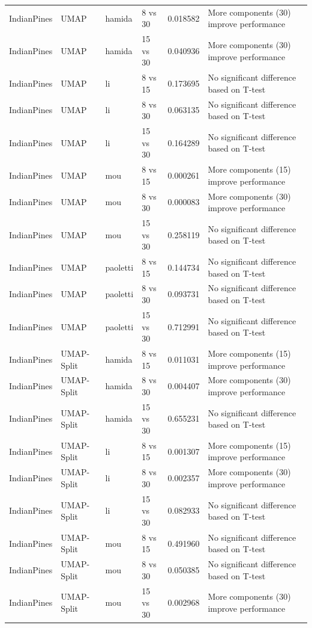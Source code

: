 \begin{longtable}{llllrl}
IndianPines & UMAP & hamida & 8 vs 30 & 0.018582 & More components (30) improve performance \\
IndianPines & UMAP & hamida & 15 vs 30 & 0.040936 & More components (30) improve performance \\
IndianPines & UMAP & li & 8 vs 15 & 0.173695 & No significant difference based on T-test \\
IndianPines & UMAP & li & 8 vs 30 & 0.063135 & No significant difference based on T-test \\
IndianPines & UMAP & li & 15 vs 30 & 0.164289 & No significant difference based on T-test \\
IndianPines & UMAP & mou & 8 vs 15 & 0.000261 & More components (15) improve performance \\
IndianPines & UMAP & mou & 8 vs 30 & 0.000083 & More components (30) improve performance \\
IndianPines & UMAP & mou & 15 vs 30 & 0.258119 & No significant difference based on T-test \\
IndianPines & UMAP & paoletti & 8 vs 15 & 0.144734 & No significant difference based on T-test \\
IndianPines & UMAP & paoletti & 8 vs 30 & 0.093731 & No significant difference based on T-test \\
IndianPines & UMAP & paoletti & 15 vs 30 & 0.712991 & No significant difference based on T-test \\
IndianPines & UMAP-Split & hamida & 8 vs 15 & 0.011031 & More components (15) improve performance \\
IndianPines & UMAP-Split & hamida & 8 vs 30 & 0.004407 & More components (30) improve performance \\
IndianPines & UMAP-Split & hamida & 15 vs 30 & 0.655231 & No significant difference based on T-test \\
IndianPines & UMAP-Split & li & 8 vs 15 & 0.001307 & More components (15) improve performance \\
IndianPines & UMAP-Split & li & 8 vs 30 & 0.002357 & More components (30) improve performance \\
IndianPines & UMAP-Split & li & 15 vs 30 & 0.082933 & No significant difference based on T-test \\
IndianPines & UMAP-Split & mou & 8 vs 15 & 0.491960 & No significant difference based on T-test \\
IndianPines & UMAP-Split & mou & 8 vs 30 & 0.050385 & No significant difference based on T-test \\
IndianPines & UMAP-Split & mou & 15 vs 30 & 0.002968 & More components (30) improve performance \\

\end{longtable}
